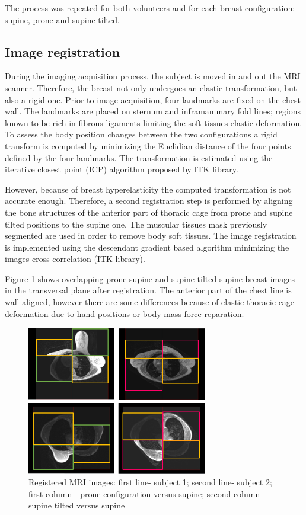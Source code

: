 The process was repeated for both volunteers and for each breast configuration: supine, prone and supine tilted.

\subsection{Image registration}\label{subsection:image registration}

During the imaging acquisition process, the subject is moved in and out the MRI scanner. Therefore, the breast not only undergoes an elastic transformation, but also a rigid one. Prior to image acquisition, four landmarks are fixed on the chest wall.  The landmarks are placed on sternum and inframammary fold lines; regions known to be rich in fibrous ligaments limiting the soft tissues elastic deformation.  To assess the body position changes between the two configurations a rigid transform is computed by minimizing the Euclidian distance of the four points defined by the four landmarks. The transformation is estimated using the iterative closest point (ICP) algorithm proposed by ITK library.

However, because of breast hyperelasticity the computed transformation is not accurate enough. Therefore, a second registration step is performed by aligning the bone structures of the anterior part of thoracic cage from prone and supine tilted positions to the supine one. The muscular tissues mask previously segmented are used in order to remove body soft tissues. The image registration is implemented using the descendant gradient based algorithm minimizing the images cross correlation (ITK library).

Figure \ref{fig:patientdataregistered} shows overlapping  prone-supine and supine tilted-supine breast images in the transversal plane after registration. The anterior part of the chest line is wall aligned, however there are some differences because of elastic thoracic cage deformation due to hand positions or body-mass force reparation. 

\begin{figure}[!h]
\centering
\includegraphics[width=0.7\textwidth,keepaspectratio]{figures/patientDataRegistered.png} 
\caption{Registered MRI images: first line- subject 1; second line- subject 2; first column - prone configuration versus supine; second column - supine tilted versus supine }\label{fig:patientdataregistered}
\end{figure}

